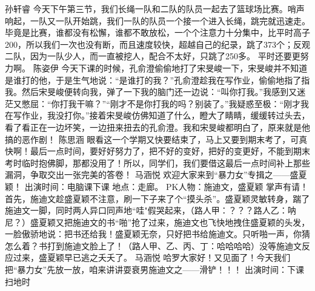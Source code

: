 {}孙轩睿\markdownRendererInterblockSeparator
{}今天下午第三节，我们长绳一队和二队的队员一起去了篮球场比赛。哨声响起，一队又一队开始跳，我们一队的队员一个接一个进入长绳，跳完就迅速走。毕竟是比赛，谁都没有松懈，谁都不敢放松，一个个注意力十分集中，比平时高子200\markdownRendererPercentSign{}，所以我们一次也没有断，而且速度较快，超越自己的纪录，跳了373个；反观二队，因为一队少人，而一直被挖人，配合不太好，只跳了250多。\markdownRendererInterblockSeparator
{}平时还要更努力啊。\markdownRendererInterblockSeparator
{}\markdownRendererInterblockSeparator
{}陈姿伊\markdownRendererInterblockSeparator
{}今天下课的时候，孔俞澄偷偷地打了宋旻峻一下，宋旻峻并不知道是谁打的他，于是生气地说：“是谁打的我？”孔俞澄趁我在写作业，偷偷地指了指我。然后宋旻峻便转向我，弹了一下我的脑门还一边说：“叫你打我。”我感到又迷茫又憋屈：“你打我干嘛？”“刚才不是你打我的吗？别装了。”我疑惑至极：“刚才我在写作业，我没打你。”接着宋旻峻仿佛知道了什么，瞪大了睛睛，缓缓转过头去，看了看正在一边坏笑，一边扭来扭去的孔俞澄。我和宋旻峻都明白了，原来就是他搞的恶作剧！\markdownRendererInterblockSeparator
{}\markdownRendererInterblockSeparator
{}陈思涵\markdownRendererInterblockSeparator
{}眼看这一个学期又快要结束了，马上又要到期末考了，可真快啊！最后一点时间，要好好努力了，把不好的变好，把好的变更好，不能到期末考时临时抱佛脚，那都没用了！所以，同学们，我们要借这最后一点时间补上那些漏洞，争取交出一张完美的答卷！\markdownRendererInterblockSeparator
{}\markdownRendererInterblockSeparator
{}马涵悦\markdownRendererInterblockSeparator
{}欢迎大家来到“暴力女”专揖之——盛夏颖！\markdownRendererInterblockSeparator
{}出演时间：电脑课下课 地点：走廊。\markdownRendererInterblockSeparator
{}PK人物：施迪文，盛夏颖 掌声有请！ \markdownRendererInterblockSeparator
{}首先，施迪文趁盛夏颖不注意，刷一下子来了个“摸头杀”。盛夏颖灵敏转身，踹了施迪文一脚，同时两人异口同声地“哇"假哭起来，（路人甲：？？？路人乙：呐尼？）盛夏颖又把施迪文的书“啪”抢了过来，施迪文也飞快地拽住盛夏颖的头发，一脸傲骄地说：把书还给我！盛夏颖无奈，只好把书给施迪文。只听啪一声，你猜怎么着？书打到施迪文脸上了！（路人甲、乙、丙、丁：哈哈哈哈）没等施迪文反应过来，盛夏颖早已逃之夭夭了。 \markdownRendererInterblockSeparator
{}\markdownRendererInterblockSeparator
{}马涵悦\markdownRendererInterblockSeparator
{}哈罗大家好！又见面了！今天我们把“暴力女”先放一放，咱来讲讲耍衰男施迪文之——滑铲！！！\markdownRendererInterblockSeparator
{}出演时间：下课扫地时\markdownRendererInterblockSeparator

